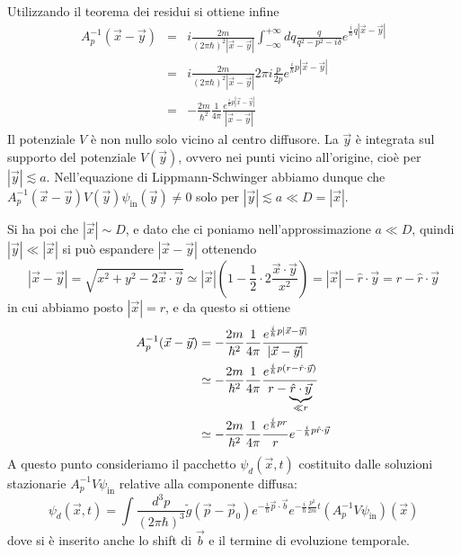\documentclass[../../FisicaTeorica.tex]{subfiles}
\begin{document}
Utilizzando il teorema dei residui si ottiene infine
\begin{eqnarray*}
  A_p^{- 1}  (\vec{x} - \vec{y}) & = & i \frac{2 m}{(2 \pi \hbar)^2 | \vec{x}
  - \vec{y} |}  \int_{- \infty}^{+ \infty} d q \frac{q}{q^2 - p^2 - i \delta}
  e^{\frac{i}{\hbar} q | \vec{x} - \vec{y} |}\\
  & = & i \frac{2 m}{(2 \pi \hbar)^2 | \vec{x} - \vec{y} |} 2 \pi i
  \frac{p}{2 p} e^{\frac{i}{\hbar} p | \vec{x} - \vec{y} |}\\
  & = & - \frac{2 m}{\hbar^2}  \frac{1}{4 \pi}  \frac{e^{\frac{i}{\hbar} p | \vec{x} -
  \vec{y} |}}{| \vec{x} - \vec{y} |}
\end{eqnarray*}
Il potenziale $V$ {\`e} non nullo solo vicino al centro diffusore. La
$\vec{y}$ {\`e} integrata sul supporto del potenziale $V (\vec{y})$, ovvero
nei punti vicino all'origine, cio{\`e} per $| \vec{y} | \lesssim a$.
Nell'equazione di Lippmann-Schwinger abbiamo dunque che $A_p^{- 1}  (\vec{x} -
\vec{y}) V (\vec{y}) \psi_{\text{in}} (\vec{y}) \neq 0$ solo per $| \vec{y} |
\lesssim a \ll D = | \vec{x} |$.

Si ha poi che $| \vec{x} | \sim D$, e dato che ci poniamo nell'approssimazione
$a \ll D$, quindi $| \vec{y} | \ll | \vec{x} |$ si pu{\`o} espandere $|
\vec{x} - \vec{y} |$ ottenendo
\[ | \vec{x} - \vec{y} | = \sqrt{x^2 + y^2 - 2 \vec{x} \cdot \vec{y}} \simeq |
   \vec{x} | \left( 1 - \frac{1}{2} \cdot 2 \frac{\vec{x} \cdot \vec{y}}{x^2}
   \right) = | \vec{x} | - \hat{r} \cdot \vec{y} = r - \hat{r} \cdot \vec{y}
\]
in cui abbiamo posto $| \vec{x} | = r$, e da questo si ottiene
\begin{align}
  A_p^{- 1}  (\vec{x} - \vec{y}) & = - \frac{2 m}{\hbar^2}  \frac{1}{4 \pi} 
  \frac{e^{\frac{i}{\hbar} p | \vec{x} - \vec{y} |}}{| \vec{x} - \vec{y} |} \notag \\
  & \simeq - \frac{2 m}{\hbar^2}  \frac{1}{4 \pi}  \frac{e^{\frac{i}{\hbar} p (r -
  \hat{r} \cdot \vec{y})}}{r - \underbrace{\hat{r} \cdot \vec{y}}_{\ll r}} \notag \\
  & \simeq - \frac{2 m}{\hbar^2}  \frac{1}{4 \pi}  \frac{e^{\frac{i}{\hbar} pr}}{r} e^{-
  \frac{i}{\hbar} p \hat{r} \cdot \vec{y}} \label{approssimazioneInvA}
\end{align}
A questo punto consideriamo il pacchetto $\psi_d (\vec{x}, t)$ costituito
dalle soluzioni stazionarie $A_p^{- 1} V \psi_{\text{in}}$ relative alla
componente diffusa:
\[ \psi_d (\vec{x}, t) = \int \frac{d^3 p}{(2 \pi \hbar)^3}  \tilde{g}
   (\vec{p} - \vec{p}_0) e^{- \frac{i}{\hbar} \vec{p} \cdot \vec{b}} e^{-
   \frac{i}{\hbar} \frac{p^2}{2 m} t} (A_p^{- 1} V \psi_{\text{in}}) (\vec{x})
\]
dove si {\`e} inserito anche lo shift di $\vec{b}$ e il termine di evoluzione
temporale.
\end{document}

